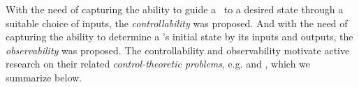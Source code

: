 With the need of capturing the ability to guide a \BCN\ to a desired state through a suitable choice of inputs, the {\em controllability} was proposed. And with the need of capturing the ability to determine a \BCN's initial state by its inputs and outputs, the {\em observability}  was proposed. The controllability and observability motivate active research on their related {\em control-theoretic problems}, e.g.  \cite{cheng2009controllability, Zhao2010Input, Cheng2011Identification, Cheng2011Analysis} and \cite{Fornasini2013Observability}, which we summarize below.







